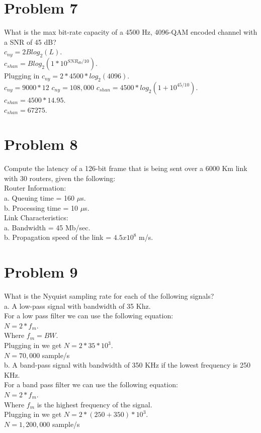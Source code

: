 \documentclass{article}
\begin{document}
\section*{Problem 7} %
What is the max bit-rate capacity of a 4500 Hz, 4096-QAM encoded channel with a SNR of
45 dB?\\
$c_{ny} = 2B log_{2}(L)$.\\
$c_{shan} = Blog_{2}(1 * 10^{SNR_{db}/10})$.\\
Plugging in
$c_{ny} = 2 * 4500 * log_{2}(4096)$.\\
$c_{ny} = 9000 * 12$
$c_{ny} = 108,000$
$c_{shan} = 4500 * log_{2}(1 + 10^{45/10})$.\\
$c_{shan} = 4500 * 14.95$.\\
$c_{shan} = 67275$.\\

\section*{Problem 8}
Compute the latency of a 126-bit frame that is being sent over a 6000 Km link with 30
routers, given the following:\\
\subP Router Information:\\
\subP a. Queuing time = 160 $\mu$s.\\
\subP b. Processing time = 10 $\mu$s.\\
Link Characteristics:\\
\subP a. Bandwidth = 45 Mb/sec.\\
\subP b. Propagation speed of the link = $4.5x10^8$ m/s.\\

\section*{Problem 9} %
What is the Nyquist sampling rate for each of the following signals?\\
\subP a. A low-pass signal with bandwidth of 35 Khz.\\

For a low pass filter we can use the following equation:\\
$N = 2*f_{m}$.\\
Where $f_{m} = BW$.\\
Plugging in we get $N = 2*35 * 10^{3}$.\\
$N = 70,000$ sample/s\\

\subP b. A band-pass signal with bandwidth of 350 KHz if the lowest
frequency is 250 KHz.\\
For a band pass filter we can use the following equation:\\
$N = 2*f_{m}$.\\
Where $f_{m}$ is the highest frequency of the signal.\\
Plugging in we get $N = 2*(250 + 350) * 10^{3}$.\\
$N = 1,200,000$ sample/s\\
\end{document}
